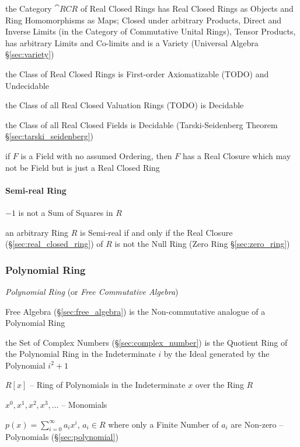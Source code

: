 the Category $\cat{RCR}$ of Real Closed Rings has Real Closed Rings as Objects
and Ring Homomorphisms as Maps; Closed under arbitrary Products, Direct and
Inverse Limits (in the Category of Commutative Unital Rings), Tensor Products,
has arbitrary Limits and Co-limits and is a Variety (Universal Algebra
\S\ref{sec:variety})

the Class of Real Closed Rings is First-order Axiomatizable (TODO) and
Undecidable

the Class of all Real Closed Valuation Rings (TODO) is Decidable

the Class of all Real Closed Fields is Decidable (\fist Tarski-Seidenberg
Theorem \S\ref{sec:tarski_seidenberg})

if $F$ is a Field with no assumed Ordering, then $F$ has a Real Closure which
may not be Field but is just a Real Closed Ring



\paragraph{Semi-real Ring}\label{sec:semireal_ring}\hfill

$-1$ is not a Sum of Squares in $R$

an arbitrary Ring $R$ is Semi-real if and only if the Real Closure
(\S\ref{sec:real_closed_ring}) of $R$ is not the Null Ring (Zero Ring
\S\ref{sec:zero_ring})



\subsubsection{Polynomial Ring}\label{sec:polynomial_ring}

\emph{Polynomial Ring} (or \emph{Free Commutative Algebra})

Free Algebra (\S\ref{sec:free_algebra}) is the Non-commutative
analogue of a Polynomial Ring

the Set of Complex Numbers (\S\ref{sec:complex_number}) is the Quotient Ring of
the Polynomial Ring in the Indeterminate $i$ by the Ideal generated by the
Polynomial $i^2 + 1$

$R[x]$ -- Ring of Polynomials in the Indeterminate $x$ over the Ring $R$

$x^0, x^1, x^2, x^3, \ldots$ -- Monomials

$p(x) = \sum_{i=0}^\infty a_i x^i$, $a_i \in R$ where only a Finite Number of
$a_i$ are Non-zero -- Polynomials (\S\ref{sec:polynomial})


